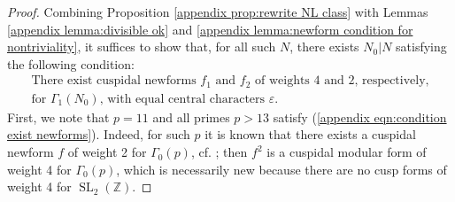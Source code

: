 \documentclass[12pt]{amsart}
\DeclareMathOperator{\SL}{SL}
\theoremstyle{definition}
\newcommand{\Z}{\mathbb{Z}}
\begin{document}
\begin{proof}

Combining Proposition \ref{appendix prop:rewrite NL class} with Lemmas \ref{appendix lemma:divisible ok} and  \ref{appendix lemma:newform condition for nontriviality}, it suffices to show that, for all such $N$, there  exists $N_0|N$ satisfying the following condition:
\begin{equation}\label{appendix eqn:condition exist newforms}
    \tag{$\ast$}\begin{split}\textrm{There exist cuspidal newforms $f_1$ and $f_2$ of weights 4 and 2, respectively,} \\ \textrm{for  $\Gamma_1(N_0)$, with equal central characters $\varepsilon$.}\end{split}
\end{equation}
First, we note that $p = 11$ and all primes $p > 13$ satisfy (\ref{appendix eqn:condition exist newforms}). Indeed, for such $p$ it is known that there exists a cuspidal newform $f$ of weight 2 for $\Gamma_0(p)$, cf. \cite[Proposition B.3]{halberstadt2002courbes}; then $f^2$ is a cuspidal modular form of weight 4 for $\Gamma_0(p)$, which is necessarily new because there are no cusp forms of weight 4 for $\SL_2(\Z)$. 


\end{proof}
\end{document}
